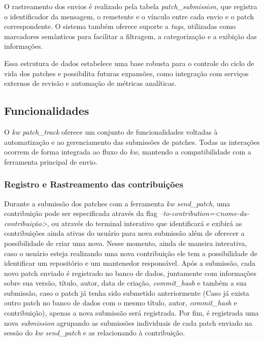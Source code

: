 O rastreamento dos envios é realizado pela tabela \textit{patch\_submission}, que registra o identificador da mensagem, o remetente e o vínculo entre cada envio e o patch correspondente. O sistema também oferece suporte a \textit{tags}, utilizadas como marcadores semânticos para facilitar a filtragem, a categorização e a exibição das informações.

Essa estrutura de dados estabelece uma base robusta para o controle do ciclo de vida dos patches e possibilita futuras expansões, como integração com serviços externos de revisão e automação de métricas analíticas.

\subsection{Funcionalidades}

O \textit{kw patch\_track} oferece um conjunto de funcionalidades voltadas à automatização e ao gerenciamento das submissões de patches. Todas as interações ocorrem de forma integrada ao fluxo do \textit{kw}, mantendo a compatibilidade com a ferramenta principal de envio.

\subsubsection{Registro e Rastreamento das contribuições}
Durante a submissão dos patches com a ferramenta \textit{kw send\_patch}, uma contribuição pode ser especificada através da flag \textit{--to-contribution=<nome-da-contribuição>}, ou através do terminal interativo que identificará e exibirá as contribuições ainda ativas do usuário para nova submissão além de oferecer a possibilidade de criar uma nova. Nesse momento, ainda de maneira interativa, caso o usuário esteja realizando uma nova contribuição ele tem a possibilidade de identificar um repositório e um mantenedor responsável. Após a submissão, cada novo patch enviado é registrado no banco de dados, juntamente com informações sobre sua versão, título, autor, data de criação, \textit{commit\_hash} e também a sua submissão, caso o patch já tenha sido submetido anteriormente (Caso já exista outro patch no banco de dados com o mesmo título, autor, \textit{commit\_hash} e contribuição), apenas a nova submissão será registrada. Por fim, é registrada uma nova \textit{submission} agrupando as submissões individuais de cada patch enviado na sessão do \textit{kw send\_patch} e as relacionando à contribuição.

